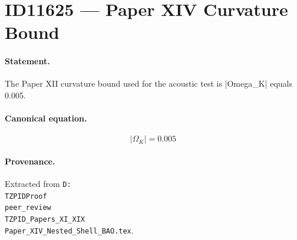 \section*{ID11625 --- Paper XIV Curvature Bound}

\paragraph{Statement.}
The Paper XII curvature bound used for the acoustic test is |Omega_K| equals 0.005.

\paragraph{Canonical equation.}
\[
|\Omega_K|=0.005
\]

\paragraph{Provenance.}
Extracted from \texttt{D:\\TZPIDProof\\peer\_review\\TZPID\_Papers\_XI\_XIX\\Paper\_XIV\_Nested\_Shell\_BAO.tex}.
